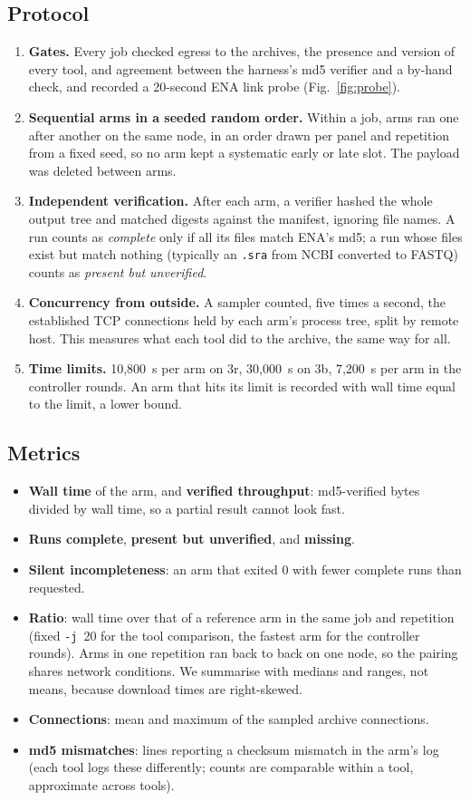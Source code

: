\documentclass[11pt,a4paper]{article}
\newcommand{\code}[1]{\texttt{#1}}
\newcommand{\figref}[1]{Fig.~\ref{#1}}
\begin{document}
\subsection{Protocol}
\begin{enumerate}
\item \textbf{Gates.} Every job checked egress to the archives, the presence and version of every tool, and agreement
between the harness's md5 verifier and a by-hand check, and recorded a 20-second ENA link probe (\figref{fig:probe}).
\item \textbf{Sequential arms in a seeded random order.} Within a job, arms ran one after another on the same node, in an
order drawn per panel and repetition from a fixed seed, so no arm kept a systematic early or late slot. The payload was
deleted between arms.
\item \textbf{Independent verification.} After each arm, a verifier hashed the whole output tree and matched digests
against the manifest, ignoring file names. A run counts as \emph{complete} only if all its files match ENA's md5;
a run whose files exist but match nothing (typically an \code{.sra} from NCBI converted to FASTQ) counts as
\emph{present but unverified}.
\item \textbf{Concurrency from outside.} A sampler counted, five times a second, the established TCP connections held by
each arm's process tree, split by remote host. This measures what each tool did to the archive, the same way for all.
\item \textbf{Time limits.} 10,800~s per arm on 3r, 30,000~s on 3b, 7,200~s per arm in the controller rounds. An arm
that hits its limit is recorded with wall time equal to the limit, a lower bound.
\end{enumerate}

\subsection{Metrics}
\begin{itemize}
\item \textbf{Wall time} of the arm, and \textbf{verified throughput}: md5-verified bytes divided by wall time, so a
partial result cannot look fast.
\item \textbf{Runs complete}, \textbf{present but unverified}, and \textbf{missing}.
\item \textbf{Silent incompleteness}: an arm that exited 0 with fewer complete runs than requested.
\item \textbf{Ratio}: wall time over that of a reference arm in the same job and repetition (fixed \code{-j}~20 for the
tool comparison, the fastest arm for the controller rounds). Arms in one repetition ran back to back on one node, so
the pairing shares network conditions. We summarise with medians and ranges, not means, because download times are
right-skewed.
\item \textbf{Connections}: mean and maximum of the sampled archive connections.
\item \textbf{md5 mismatches}: lines reporting a checksum mismatch in the arm's log (each tool logs these differently;
counts are comparable within a tool, approximate across tools).
\end{itemize}
\end{document}
